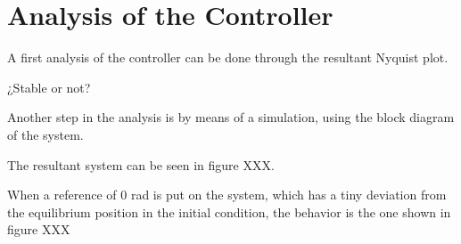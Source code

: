 \section{Analysis of the Controller}\label{analysisController}
A first analysis of the controller can be done through the resultant Nyquist plot.


¿Stable or not?

Another step in the analysis is by means of a simulation, using the block diagram of the system.

The resultant system can be seen in figure XXX.


When a reference of 0 rad is put on the system, which has a tiny deviation from the equilibrium position in the initial condition, the behavior is the one shown in figure XXX

